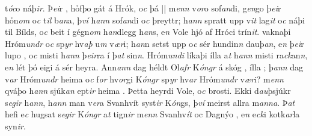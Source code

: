 t\textit{óc}o náþ\textit{ir}. 
Þ\textit{ei}r  , hỏfþo gát á   Hrók, o\textit{c} þá 
||
m\textit{enn} v\textit{or}o sof\textit{an}di, g\textit{en}go
þ\textit{ei}r   hỏn\textit{om} o\textit{c}  t\textit{il} b\textit{an}a, þ\textit{ví} h\textit{ann}  sof\textit{an}di o\textit{c}  þreyttr; h\textit{ann} spratt upp v\textit{it} lag\textit{it} o\textit{c}
náþi til  Bílds, o\textit{c} beit í gégn\textit{om} h\textit{an}dlegg h\textit{an}s, e\textit{n} Vole hjó af Hróci   trín\textit{it}.
  vaknaþi Hróm\textit{undr} o\textit{c} sp\textit{yr} hv\textit{aþ}
u\textit{m} v\textit{ær}i; h\textit{an}n  setst upp o\textit{c}
sér hundin\textit{n} dauþ\textit{an}, e\textit{n} þ\textit{ei}r   lupo  , o\textit{c} misti h\textit{ann} þ\textit{eir}ra í þ\textit{at}
sin\textit{n}. Hróm\textit{undi} líkaþi ílla  a\textit{t}
h\textit{ann} misti ra\textit{ck}an\textit{n}, e\textit{n} lét þó eigi á sér
heyra. Ann\textit{an}\textit{n} dag   héldt Ol\textit{afr} K\textit{óngr} á skóg  , 
  ílla  ; þ\textit{an}\textit{n} dag v\textit{ar} Hróm\textit{undr} heima
o\textit{c} f\textit{or} hv\textit{or}gi  K\textit{óngr}
sp\textit{yr} hv\textit{ar} Hróm\textit{undr} v\textit{ær}i? m\textit{enn}
qváþo h\textit{ann} sjúk\textit{an} ept\textit{ir} heima  .  Þetta heyrdi Vole, o\textit{c} brosti. Ekki d\textit{au}þsjúkr s\textit{egir} h\textit{ann}, h\textit{ann} man   v\textit{er}a    Svanhvít syst\textit{ir} K\textit{ón}gs, þ\textit{ví}  meirst allra m\textit{anna}. Þ\textit{at} hefi e\textit{c} hugsat s\textit{egir} K\textit{óngr} a\textit{t}
tign\textit{ir} m\textit{enn}  Svanhv\textit{ít} oc  Dagnýo  , e\textit{n} e\textit{ck}i kotk\textit{ar}la syn\textit{ir}. 
